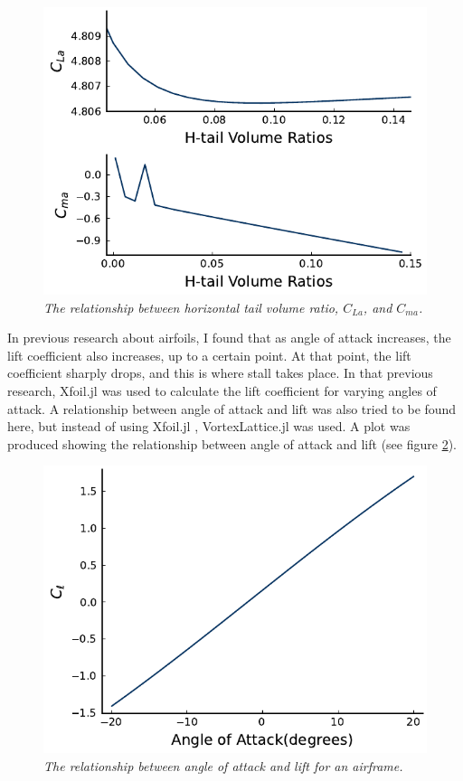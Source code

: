\documentclass{journal}
\begin{document}
	\begin{figure}[H]
		\centering
		\includegraphics[scale=0.73]{../graphics/htail-stability.pdf}
		\caption{\emph{The relationship between horizontal tail volume ratio, \(C_{La}\), and \(C_{ma}\).}}
		\label{fig:htail-stability}
	\end{figure}
	
	In previous research about airfoils, I found that as angle of attack increases, the lift coefficient also increases, up to a certain point. At that point, the lift coefficient sharply drops, and this is where stall takes place. In that previous research, Xfoil.jl \cite{McDonnell} was used to calculate the lift coefficient for varying angles of attack. A relationship between angle of attack and lift was also tried to be found here, but instead of using Xfoil.jl \cite{McDonnell}, VortexLattice.jl \cite{McDonnell-Ning} was used. A plot was produced showing the relationship between angle of attack and lift (see figure \ref{fig:aoa-lift}).\\
	
	\begin{figure}[H]
		\centering
		\includegraphics{../graphics/aoa-lift.pdf}
		\caption{\emph{The relationship between angle of attack and lift for an airframe.}}
		\label{fig:aoa-lift}
	\end{figure}
	
\end{document}
